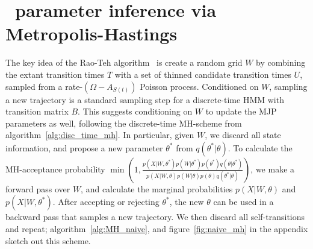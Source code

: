 \section{\Naive\ parameter inference via Metropolis-Hastings}

The key idea of the Rao-Teh algorithm~\cite{RaoTeh13} is create a random 
grid $W$ by combining the extant transition times $T$ with a set of 
thinned candidate transition times $U$, sampled from a rate-$(\Omega-A_{S(t)})$ 
Poisson process. Conditioned on $W$, sampling a new trajectory is a 
standard sampling step for a discrete-time HMM with transition matrix $B$. 
This suggests conditioning on $W$ to update
the MJP parameters as well, following the discrete-time MH-scheme from
algorithm~\ref{alg:disc_time_mh}.
In particular, given $W$, we discard all state information, and propose a 
new parameter $\theta^*$ from $q(\theta^*|\theta)$. 
To calculate the MH-acceptance probability $\min\left(1,
\frac{p(X|W,\theta^*)p(W|\theta^*)p(\theta^*)q(\theta|\theta^*)}
     {p(X|W,\theta)p(W|\theta)p(\theta)q(\theta^*|\theta)}\right)$, 
we make a forward pass over $W$, and calculate the marginal 
probabilities $p(X|W,\theta)$ and $p(X|W,\theta^*)$. %
After accepting or rejecting $\theta^*$, the new $\theta$ can be used in
a backward pass that samples a new trajectory. We then discard all 
self-transitions and repeat; algorithm~\ref{alg:MH_naive}, and 
figure~\ref{fig:naive_mh} in the appendix sketch out this 
scheme.

